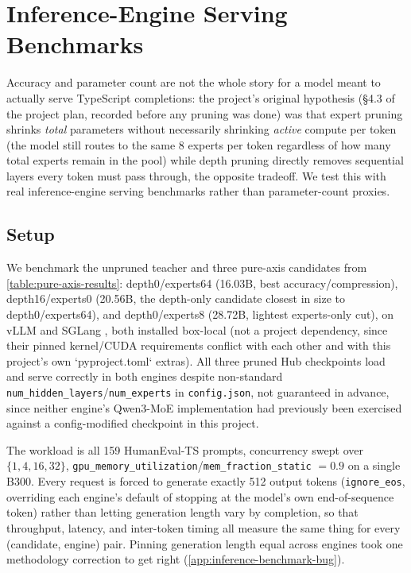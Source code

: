 \documentclass{article}
\theoremstyle{plain}
\theoremstyle{definition}
\theoremstyle{remark}
\begin{document}
\section{Inference-Engine Serving Benchmarks}
\label{sec:inference-benchmark}

Accuracy and parameter count are not the whole story for a model meant to
actually serve TypeScript completions: the project's original hypothesis
(\S4.3 of the project plan, recorded before any pruning was done) was that
expert pruning shrinks \emph{total} parameters without necessarily
shrinking \emph{active} compute per token (the model still routes to the
same 8 experts per token regardless of how many total experts remain in
the pool) while depth pruning directly removes sequential layers every
token must pass through, the opposite tradeoff. We test this with real
inference-engine serving benchmarks rather than parameter-count proxies.

\subsection{Setup}
\label{sec:inference-benchmark-setup}

We benchmark the unpruned teacher and three pure-axis candidates from
\cref{table:pure-axis-results}: depth0/experts64 (16.03B, best
accuracy/compression), depth16/experts0 (20.56B, the depth-only candidate
closest in size to depth0/experts64), and depth0/experts8 (28.72B,
lightest experts-only cut), on vLLM \cite{vllm2023} and SGLang
\cite{sglang2024}, both installed box-local (not a project dependency,
since their pinned kernel/CUDA requirements conflict with each other and
with this project's own `pyproject.toml` extras). All three pruned Hub
checkpoints load and serve correctly in both engines despite non-standard
\texttt{num\_hidden\_layers}/\texttt{num\_experts} in \texttt{config.json},
not guaranteed in advance, since neither engine's Qwen3-MoE
implementation had previously been exercised against a config-modified
checkpoint in this project.

The workload is all 159 HumanEval-TS prompts, concurrency swept over
$\{1, 4, 16, 32\}$, \texttt{gpu\_memory\_utilization}/\texttt{mem\_fraction\_static}
$=0.9$ on a single B300. Every request is forced to generate exactly 512
output tokens (\texttt{ignore\_eos}, overriding each engine's default of
stopping at the model's own end-of-sequence token) rather than letting
generation length vary by completion, so that throughput, latency, and
inter-token timing all measure the same thing for every (candidate,
engine) pair. Pinning generation length equal across engines took one
methodology correction to get right (\cref{app:inference-benchmark-bug}).
\end{document}
